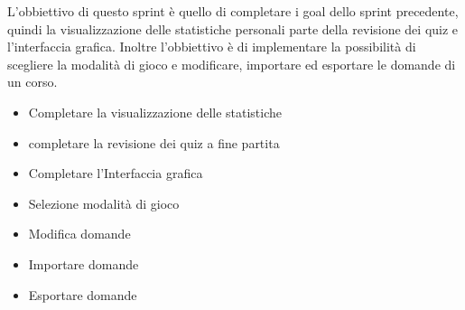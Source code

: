 L'obbiettivo di questo sprint è quello di completare i goal dello sprint precedente, quindi la visualizzazione delle statistiche personali parte della revisione dei quiz e l'interfaccia grafica. Inoltre l'obbiettivo è di implementare la possibilità di scegliere la modalità di gioco e modificare, importare ed esportare le domande di un corso.
\begin{itemize}
    \item Completare la visualizzazione delle statistiche
    \item completare la revisione dei quiz a fine partita
    \item Completare l'Interfaccia grafica
    \item Selezione modalità di gioco
    \item Modifica domande
    \item Importare domande
    \item Esportare domande
\end{itemize} 